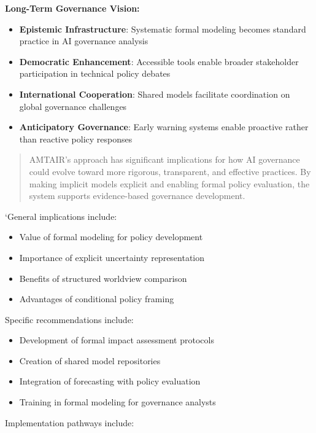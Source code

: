 \documentclass[
  11pt,
  letterpaper,
]{book}
\providecommand{\tightlist}{%
  \setlength{\itemsep}{0pt}\setlength{\parskip}{0pt}}
\begin{document}
\textbf{Long-Term Governance Vision:}

\begin{itemize}
\tightlist
\item
  \textbf{Epistemic Infrastructure}: Systematic formal modeling becomes
  standard practice in AI governance analysis
\item
  \textbf{Democratic Enhancement}: Accessible tools enable broader
  stakeholder participation in technical policy debates
\item
  \textbf{International Cooperation}: Shared models facilitate
  coordination on global governance challenges
\item
  \textbf{Anticipatory Governance}: Early warning systems enable
  proactive rather than reactive policy responses
\end{itemize}

\begin{quote}
AMTAIR's approach has significant implications for how AI governance
could evolve toward more rigorous, transparent, and effective practices.
By making implicit models explicit and enabling formal policy
evaluation, the system supports evidence-based governance development.
\end{quote}

`General implications include:

\begin{itemize}
\tightlist
\item
  Value of formal modeling for policy development
\item
  Importance of explicit uncertainty representation
\item
  Benefits of structured worldview comparison
\item
  Advantages of conditional policy framing
\end{itemize}

Specific recommendations include:

\begin{itemize}
\tightlist
\item
  Development of formal impact assessment protocols
\item
  Creation of shared model repositories
\item
  Integration of forecasting with policy evaluation
\item
  Training in formal modeling for governance analysts
\end{itemize}

Implementation pathways include:
\end{document}
